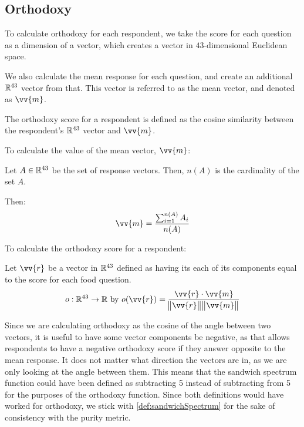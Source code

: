 \subsection{Orthodoxy}\label{subsec:orthodoxyMetric}
To calculate orthodoxy for each respondent, we take the score for each question as a dimension of a vector, which creates a vector in $43$-dimensional Euclidean space.

We also calculate the mean response for each question, and create an additional $\mathbb{R}^{43}$ vector from that.
This vector is referred to as the mean vector, and denoted as $\vv{m}$.

The orthodoxy score for a respondent is defined as the cosine similarity between the respondent's $\mathbb{R}^{43}$ vector and $\vv{m}$.

\begin{definition}
	To calculate the value of the mean vector, $\vv{m}$:

	Let $A \in \mathbb{R}^{43}$ be the set of response vectors.
	Then, $n(A)$ is the cardinality of the set $A$.

	Then:
	\begin{equation}
		\vv{m} = \frac{\sum_{i = 1}^{n(A)} A_i}{n(A)}
	\end{equation}
\end{definition}

\begin{definition}
	To calculate the orthodoxy score for a respondent:

	Let $\vv{r}$ be a vector in $\mathbb{R}^{43}$ defined as having its each of its components equal to the score for each food question.
	\begin{equation}
		o \from \real^{43} \to \real\ \text{by}\ o(\vv{r}) = \frac{\vv{r} \cdot \vv{m}}{\norm{\vv{r}} \norm{\vv{m}}}
	\end{equation}
\end{definition}

Since we are calculating orthodoxy as the cosine of the angle between two vectors, it is useful to have some vector components be negative, as that allows respondents to have a negative orthodoxy score if they answer opposite to the mean response.
It does not matter what direction the vectors are in, as we are only looking at the angle between them.
This means that the sandwich spectrum function could have been defined as subtracting 5 instead of subtracting from 5 for the purposes of the orthodoxy function.
Since both definitions would have worked for orthodoxy, we stick with \cref{def:sandwichSpectrum} for the sake of consistency with the purity metric.
